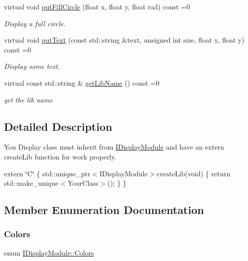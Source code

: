 \begin{DoxyCompactItemize}
virtual void \hyperlink{class_i_display_module_a19302fcc5fb72ace6374fa26f5430d65}{put\+Fill\+Circle} (float x, float y, float rad) const =0
\begin{DoxyCompactList}\small\item\em Display a full circle. \end{DoxyCompactList}\item 
virtual void \hyperlink{class_i_display_module_abe8a1550641c226b49646abf54f21493}{put\+Text} (const std\+::string \&text, unsigned int size, float x, float y) const =0
\begin{DoxyCompactList}\small\item\em Display some text. \end{DoxyCompactList}\item 
virtual const std\+::string \& \hyperlink{class_i_display_module_a9bf79b064eeac8c3e2e5c8e018fef5bb}{get\+Lib\+Name} () const =0
\begin{DoxyCompactList}\small\item\em get the lib name \end{DoxyCompactList}\end{DoxyCompactItemize}


\subsection{Detailed Description}
You Display class must inherit from \hyperlink{class_i_display_module}{I\+Display\+Module} and have an extern create\+Lib function for work properly. 

extern \char`\"{}\+C\char`\"{} \{ std\+::unique\+\_\+ptr$<$\+I\+Display\+Module$>$create\+Lib(void) \{ return std\+::make\+\_\+unique$<$\+Your\+Class$>$(); \} \} 

\subsection{Member Enumeration Documentation}
\mbox{\label{class_i_display_module_a1130023f28ca7d10e4a04ef9b698fcbb}} 
\subsubsection{\texorpdfstring{Colors}{Colors}}
{\footnotesize\ttfamily enum \hyperlink{class_i_display_module_a1130023f28ca7d10e4a04ef9b698fcbb}{I\+Display\+Module\+::\+Colors}}

